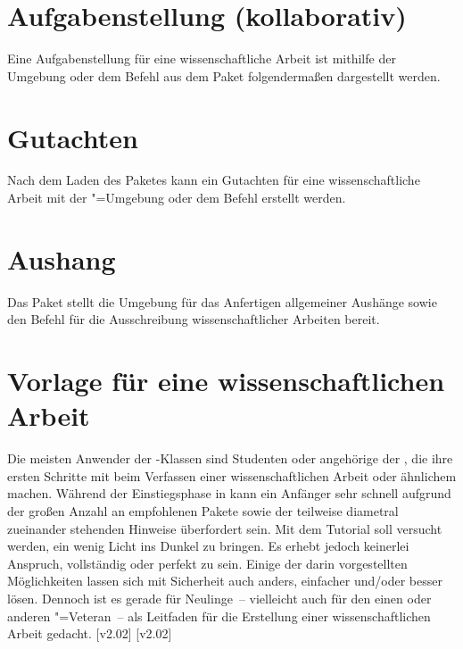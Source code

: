 \section{Aufgabenstellung (kollaborativ)}
\label{sec:exmpl:task}
Eine Aufgabenstellung für eine wissenschaftliche Arbeit ist mithilfe der 
Umgebung  oder dem Befehl  aus dem Paket 
 folgendermaßen dargestellt werden.
\section{Gutachten}
\label{sec:exmpl:evaluation}
Nach dem Laden des Paketes  kann ein Gutachten für 
eine wissenschaftliche Arbeit mit der "=Umgebung oder 
dem Befehl  erstellt werden.
\section{Aushang}
\label{sec:exmpl:notice}
Das Paket  stellt die Umgebung  
für das Anfertigen allgemeiner Aushänge sowie den Befehl  
für die Ausschreibung wissenschaftlicher Arbeiten bereit.
\section{Vorlage für eine wissenschaftlichen Arbeit}
\label{sec:exmpl:treatise}
Die meisten Anwender der \TUDScript-Klassen sind Studenten oder angehörige der 
\TnUD, die ihre ersten Schritte mit  beim Verfassen einer 
wissenschaftlichen Arbeit oder ähnlichem machen. Während der Einstiegsphase in 
 kann ein Anfänger sehr schnell aufgrund der großen Anzahl an 
empfohlenen Pakete sowie der teilweise diametral zueinander stehenden Hinweise 
überfordert sein. Mit dem Tutorial  soll versucht werden, 
ein wenig Licht ins Dunkel zu bringen. Es erhebt jedoch keinerlei Anspruch, 
vollständig oder perfekt zu sein. Einige der darin vorgestellten Möglichkeiten 
lassen sich mit Sicherheit auch anders, einfacher und/oder besser lösen. 
Dennoch ist es gerade für Neulinge~-- vielleicht auch für den einen oder 
anderen "=Veteran~-- als Leitfaden für die Erstellung einer 
wissenschaftlichen Arbeit gedacht.
[v2.02]
[v2.02]
